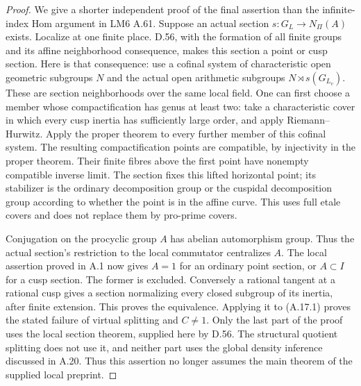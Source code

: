 \begin{proof}
We give a shorter independent proof of the final assertion
than the infinite-index Hom argument in LM6 A.61. Suppose an
actual section $s:G_L\to N_\Pi(A)$ exists. Localize at one
finite place. D.56, with the formation of all finite groups
and its affine neighborhood consequence, makes this section
a point or cusp section.
Here is that consequence: use a cofinal system of characteristic
open geometric subgroups $N$ and the actual open arithmetic
subgroups $N\rtimes s(G_{L_v})$. These are section neighborhoods
over the same local field. One can first choose a member whose
compactification has genus at least two: take a characteristic
cover in which every cusp inertia has sufficiently large order,
and apply Riemann--Hurwitz. Apply the proper theorem to every
further member of this cofinal system. The
resulting compactification points are compatible, by injectivity
in the proper theorem. Their finite fibres above the first
point have nonempty compatible inverse limit. The section
fixes this lifted horizontal point; its stabilizer is the
ordinary decomposition group or the cuspidal decomposition
group according to whether the point is in the affine curve.
This uses full etale covers and does not replace them by
pro-prime covers.

Conjugation on the procyclic group $A$ has abelian automorphism
group. Thus the actual section's restriction to the local
commutator centralizes $A$. The local assertion proved in A.1
now gives $A=1$ for an ordinary point section, or $A\subset I$
for a cusp section. The former is excluded. Conversely a
rational tangent at a rational cusp gives a section normalizing
every closed subgroup of its inertia, after finite extension.
This proves the equivalence. Applying it to (A.17.1) proves
the stated failure of virtual splitting and $C\ne1$.
Only the last part of the proof uses the local section
theorem, supplied here by D.56. The structural quotient
splitting does not use it, and neither part uses the
global density inference discussed in A.20. Thus this
assertion no longer assumes the main theorem of the
supplied local preprint.
\end{proof}

